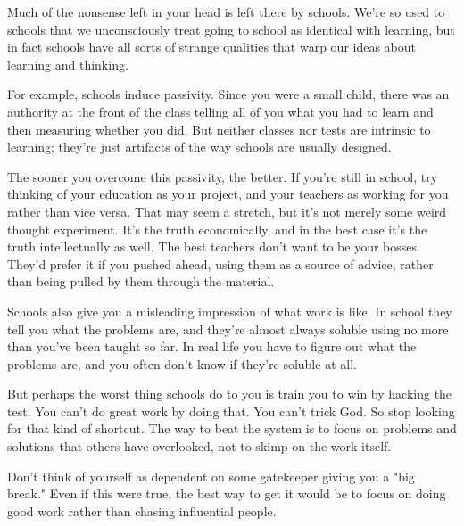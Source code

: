 Much of the nonsense left in your head
                  is left there by schools. We're so used to schools that we
                  unconsciously treat going to school as identical with
                  learning, but in fact schools have all sorts of strange
                  qualities that warp our ideas about learning and thinking.

For
                  example, schools induce passivity. Since you were a small
                  child, there was an authority at the front of the class
                  telling all of you what you had to learn and then measuring
                  whether you did. But neither classes nor tests are intrinsic
                  to learning; they're just artifacts of the way schools are
                  usually designed.

The sooner you overcome this
                  passivity, the better. If you're still in school, try thinking
                  of your education as your project, and your teachers as
                  working for you rather than vice versa. That may seem a
                  stretch, but it's not merely some weird thought experiment.
                  It's the truth economically, and in the best case it's the
                  truth intellectually as well. The best teachers don't want to
                  be your bosses. They'd prefer it if you pushed ahead, using
                  them as a source of advice, rather than being pulled by them
                  through the material.

Schools also give you a
                  misleading impression of what work is like. In school they
                  tell you what the problems are, and they're almost always
                  soluble using no more than you've been taught so far. In real
                  life you have to figure out what the problems are, and you
                  often don't know if they're soluble at all.

But
                  perhaps the worst thing schools do to you is train you to win
                  by hacking the test. You can't do great work by doing that.
                  You can't trick God. So stop looking for that kind of
                  shortcut. The way to beat the system is to focus on problems
                  and solutions that others have overlooked, not to skimp on the
                  work itself.






                  Don't think of yourself as dependent on some gatekeeper giving
                  you a "big break." Even if this were true, the best way to get
                  it would be to focus on doing good work rather than chasing
                  influential people.


